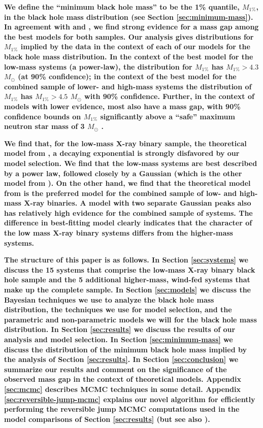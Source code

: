 \documentclass[preprint]{aastex}
\newcommand{\Msun}{M_\odot}
\newcommand{\changed}[1]{{\bf #1 }}
\begin{document}
\changed{We define the ``minimum black hole mass'' to be the 1\%
  quantile, $M_{1\%}$, in the black hole mass distribution (see
  Section \ref{sec:minimum-mass}).  In agreement with \citet{Ozel2010}
  and \citet{Bailyn1998}, we find strong evidence for a mass gap among
  the best models for both samples.  Our analysis gives distributions
  for $M_{1\%}$ implied by the data in the context of each of our
  models for the black hole mass distribution.  In the context of the
  best model for the low-mass systems (a power-law), the distribution
  for $M_{1\%}$ has $M_{1\%} > 4.3$ $\Msun$ (at 90\% confidence); in
  the context of the best model for the combined sample of lower- and
  high-mass systems the distribution of $M_{1\%}$ has $M_{1\%} > 4.5$
  $\Msun$ with 90\% confidence.  Further, in the context of models
  with lower evidence, most also have a mass gap, with 90\% confidence
  bounds on $M_{1\%}$ significantly above a ``safe'' maximum neutron
  star mass of 3 $\Msun$ \citep{Kalogera1996}.}

\changed{We find that, for the low-mass X-ray binary sample, the
  theoretical model from \citet{Fryer2001}, a decaying exponential is
  strongly disfavored by our model selection.  We find that the
  low-mass systems are best described by a power law, followed
  closely by a Gaussian (which is the other model from
  \citet{Ozel2010}).  On the other hand, we find that the theoretical
  model from \citet{Fryer2001} is the preferred model for the combined
  sample of low- and high-mass X-ray binaries.  A model with two
  separate Gaussian peaks also has relatively high evidence for the
  combined sample of systems.  The difference in best-fitting model
  clearly indicates that the character of the low mass X-ray binary
  systems differs from the higher-mass systems.}

\changed{The structure of this paper is as follows.  In Section
  \ref{sec:systems} we discuss the 15 systems that comprise the
  low-mass X-ray binary black hole sample and the 5 additional
  higher-mass, wind-fed systems that make up the complete sample.  In
  Section \ref{sec:models} we discuss the Bayesian techniques we use
  to analyze the black hole mass distribution, the techniques we use
  for model selection, and the parametric and non-parametric models we
  will for the black hole mass distribution.  In Section
  \ref{sec:results} we discuss the results of our analysis and model
  selection.  In Section \ref{sec:minimum-mass} we discuss the
  distribution of the minimum black hole mass implied by the analysis
  of Section \ref{sec:results}.  In Section \ref{sec:conclusion} we
  summarize our results and comment on the significance of the
  observed mass gap in the context of theoretical models.  Appendix
  \ref{sec:mcmc} describes MCMC techniques in some detail.  Appendix
  \ref{sec:reversible-jump-mcmc} explains our novel algorithm for
  efficiently performing the reversible jump MCMC computations used in
  the model comparisons of Section \ref{sec:results} (but see also
  \citet{Farr2010}).}
\end{document}

